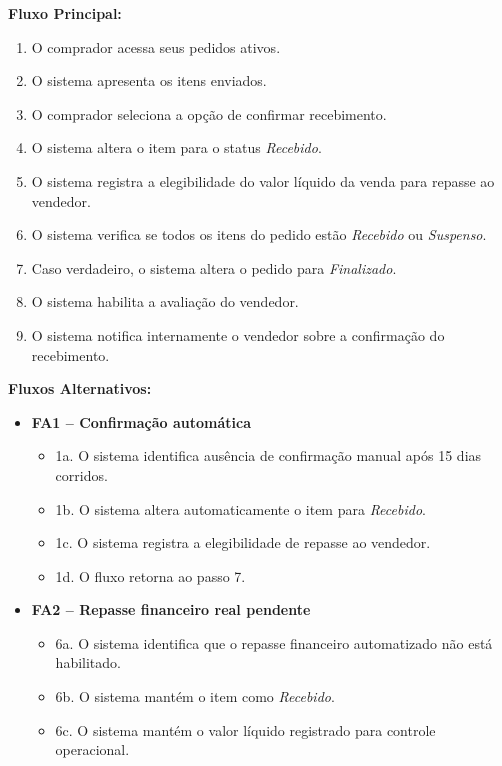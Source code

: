 ﻿\documentclass[12pt,a4paper]{article}
\begin{document}
\vspace{0.5em}
\noindent\textbf{Fluxo Principal:}
\begin{enumerate}[label=\arabic*.]
    \item O comprador acessa seus pedidos ativos.
    \item O sistema apresenta os itens enviados.
    \item O comprador seleciona a opção de confirmar recebimento.
    \item O sistema altera o item para o status \textit{Recebido}.
    \item O sistema registra a elegibilidade do valor líquido da venda para repasse ao vendedor.
    \item O sistema verifica se todos os itens do pedido estão \textit{Recebido} ou \textit{Suspenso}.
    \item Caso verdadeiro, o sistema altera o pedido para \textit{Finalizado}.
    \item O sistema habilita a avaliação do vendedor.
    \item O sistema notifica internamente o vendedor sobre a confirmação do recebimento.
\end{enumerate}

\vspace{0.5em}
\noindent\textbf{Fluxos Alternativos:}
\begin{itemize}[leftmargin=*]
    \item \textbf{FA1 – Confirmação automática}
    \begin{itemize}[label={}, leftmargin=0.5cm]
        \item 1a. O sistema identifica ausência de confirmação manual após 15 dias corridos.
        \item 1b. O sistema altera automaticamente o item para \textit{Recebido}.
        \item 1c. O sistema registra a elegibilidade de repasse ao vendedor.
        \item 1d. O fluxo retorna ao passo 7.
    \end{itemize}
    
    \item \textbf{FA2 – Repasse financeiro real pendente}
    \begin{itemize}[label={}, leftmargin=0.5cm]
        \item 6a. O sistema identifica que o repasse financeiro automatizado não está habilitado.
        \item 6b. O sistema mantém o item como \textit{Recebido}.
        \item 6c. O sistema mantém o valor líquido registrado para controle operacional.
    \end{itemize}
\end{itemize}
\end{document}
